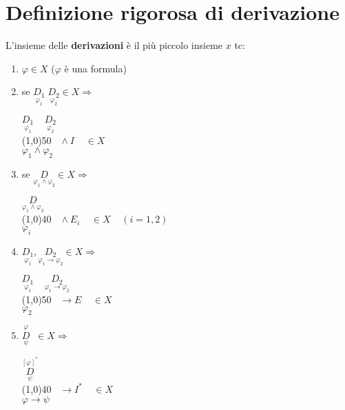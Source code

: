 \documentclass{article}
\theoremstyle{break}
\theoremstyle{break}
\theoremstyle{break}
\theoremstyle{break}
\begin{document}
\section{Definizione rigorosa di derivazione}
L'insieme delle \textbf{derivazioni} è il più piccolo insieme \( x \) tc:
\begin{enumerate}
  \item \( \varphi \in X \) (\( \varphi \) è una formula)
  \item se \( \underset{\varphi_1}{D_1}\; \underset{\varphi_2}{D_2} \in X \Rightarrow \)
    \begin{center}
      \(
      \underset{\varphi_1}{D_1}\;\;\;\; \underset{\varphi_2}{D_2}
      \)\\
      \hspace{1.8cm}\line(1,0){50}\(\;\;\; \wedge I\;\;\;\; \in X\)\\  
      \( \varphi_1 \wedge \varphi_2 \)
    \end{center}
  \item se \( \underset{\varphi_1 \wedge \varphi_2}{D} \in X  \Rightarrow\)
    \begin{center}
      \(
      \underset{\varphi_1 \wedge \varphi_2}{D}
      \)\\
      \hspace{3.8cm}\line(1,0){40}\(\;\;\; \wedge E_i\;\;\;\; \in X\;\;\;\; (i = 1,2)\)\\  
      \( \varphi_i \)
    \end{center}

  \item \( \underset{\varphi_1}{D_1}, \underset{\varphi_1 \to \varphi_2}{D_2} \in X \Rightarrow \)
    \begin{center}
      \(
      \underset{\varphi_1}{D_1}\;\;\;\; \underset{\varphi_1 \to \varphi_2}{D_2}
      \)\\
      \hspace{2.1cm}\line(1,0){50}\(\;\;\; \to E\;\;\;\; \in X\)\\  
      \( \varphi_2 \)
    \end{center}

  \item \( \underset{\psi}{\stackrel{\varphi}{D}}\;\; \in X \Rightarrow \)
    \begin{center}
      \(
      \underset{\psi}{\stackrel{[\varphi]^*}{D}}
      \)\\
      \hspace{2.3cm}\line(1,0){40}\(\;\;\; \to I^*\;\;\;\; \in X\)\\  
      \( \varphi \to \psi \)
    \end{center}


\end{enumerate}
\end{document}

